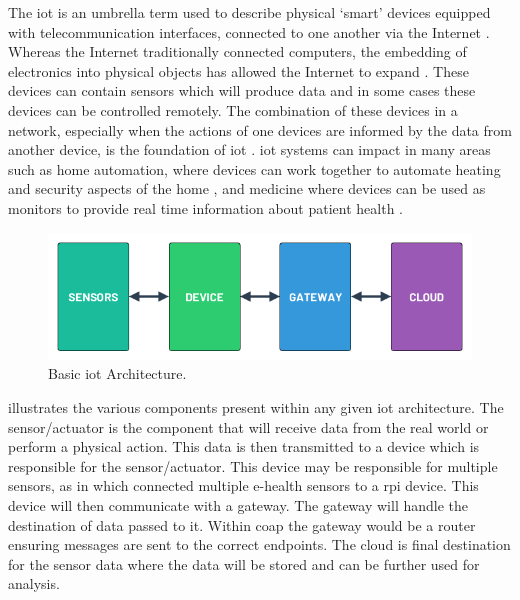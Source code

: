 The \acrfull{iot} is an umbrella term used to describe physical `smart' devices
equipped with telecommunication interfaces, connected to one another via the 
Internet \citep{centenaro_long-range_2016}.
Whereas the Internet traditionally connected computers, the embedding of 
electronics into physical objects has allowed the Internet to expand \citep{miorandi_internet_2012}.
These devices can contain sensors which will produce data and in some cases 
these devices can be controlled remotely. The combination of these devices in
a network, especially when the actions of one devices are informed by the 
data from another device, is the foundation of \gls{iot} \citep{minerva_towards_2015}.
\gls{iot} systems can impact in many areas such as home automation,
where devices can work together to automate heating and security aspects of 
the home \citep{lee_internet_2018}, and medicine where devices
can be used as monitors to provide real time information about 
patient health \citep{kumar_iot_2016}.

\begin{figure}[H]
    \centering
    \includegraphics[width=\imageWidth\textwidth]{assets/generic_iot_architecture.png}
    \caption{\label{fig:generic_iot_architecture} Basic \gls{iot} Architecture.}
\end{figure}

 illustrates the various components present
within any given \gls{iot} architecture. The sensor/actuator is the component
that will receive data from the real world or perform a physical action. This 
data is then transmitted to a device which is responsible for the sensor/actuator.
This device may be responsible for multiple sensors, as in \citet{jassas_smart_2015}
which connected multiple e-health sensors to a \gls{rpi} device. This device will
then communicate with a gateway. The gateway will handle the destination of data passed
to it. Within \gls{coap} the gateway would be a router ensuring messages are sent 
to the correct endpoints. The cloud is final destination for the sensor data where
the data will be stored and can be further used for analysis.
